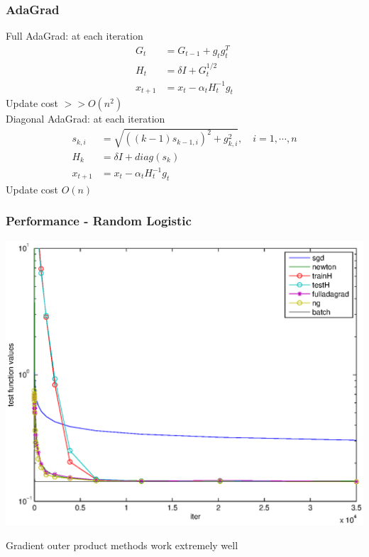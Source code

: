 \documentclass{beamer}
\begin{document}
 
\begin{frame}
	\frametitle{AdaGrad}
	Full AdaGrad: at each iteration
	\begin{align*}
	 G_t &= G_{t-1}+ g_t  g_t^T\\
	 H_t &= \delta I + G_t^{1/2}\\
	 x_{t+1} &= x_{t} - \alpha_t H_t^{-1} g_t
	\end{align*}
	Update cost $>>O(n^2)$ \\
	\pause
	Diagonal AdaGrad:  at each iteration
	\begin{align*}
     s_{k,i} &=\sqrt{ ((k-1) s_{k-1,i})^2 +g_{k,i}^2 }, \quad i=1, \cdots, n \\
     H_k &=\delta I + diag(s_k) \\
	 x_{t+1} &= x_{t} - \alpha_t H_t^{-1} g_t
	\end{align*}
	Update cost $O(n)$
\end{frame}

\begin{frame}
	\frametitle{Performance - Random Logistic}
	\begin{center}
	\includegraphics[scale=0.4]{figures/P01.eps}
	\end{center}
	Gradient outer product methods work extremely well
\end{frame}
\end{document}
